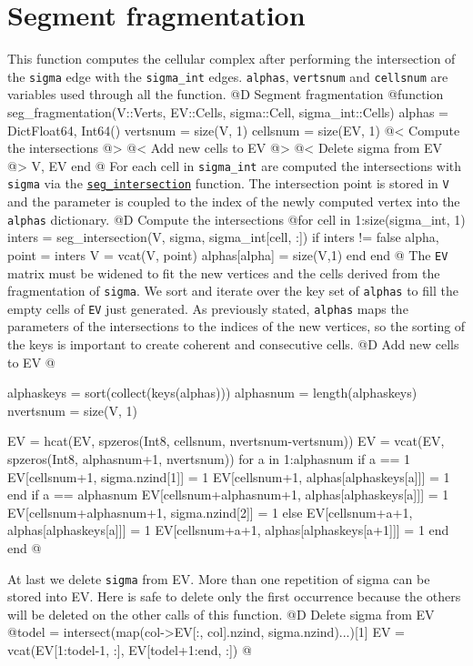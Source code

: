\documentclass[10pt,oneside]{article}
\begin{document}
\section{Segment fragmentation}
This function computes the cellular complex after performing the intersection of the \texttt{sigma} edge 
with the \texttt{sigma\_int} edges.
\texttt{alphas}, \texttt{vertsnum} and \texttt{cellsnum} are variables used through all the function.
@D Segment fragmentation
@{function seg_fragmentation(V::Verts, EV::Cells, sigma::Cell, sigma_int::Cells)
    alphas = Dict{Float64, Int64}()
    vertsnum = size(V, 1)
    cellsnum = size(EV, 1)
    @< Compute the intersections @>
    @< Add new cells to EV @>
    @< Delete sigma from EV @>
    V, EV
end
@}
For each cell in \texttt{sigma\_int} are computed the intersections with \texttt{sigma} via 
the \hyperref[seg_intersection]{\texttt{seg\_intersection}} function. The intersection point is
stored in \texttt{V} and the parameter is coupled to the index of the newly computed vertex into 
the \texttt{alphas} dictionary.
@D Compute the intersections
@{for cell in 1:size(sigma_int, 1)
    inters = seg_intersection(V, sigma, sigma_int[cell, :])
    if inters != false
        alpha, point = inters
        V = vcat(V, point)
        alphas[alpha] = size(V,1)
    end
end
@}
The \texttt{EV} matrix must be widened to fit the new vertices and the cells derived from 
the fragmentation of \texttt{sigma}. We sort and iterate over the key set of \texttt{alphas}
to fill the empty cells of \texttt{EV} just generated. As previously stated, \texttt{alphas} maps 
the parameters of the intersections to the indices of the new vertices, so the sorting of the keys 
is important to create coherent and consecutive cells.
@D Add new cells to EV
@{alphaskeys = sort(collect(keys(alphas)))
alphasnum = length(alphaskeys)
nvertsnum = size(V, 1)

EV = hcat(EV, spzeros(Int8, cellsnum, nvertsnum-vertsnum))
EV = vcat(EV, spzeros(Int8, alphasnum+1, nvertsnum))
for a in 1:alphasnum
    if a == 1
        EV[cellsnum+1, sigma.nzind[1]] = 1
        EV[cellsnum+1, alphas[alphaskeys[a]]] = 1
    end
    if a == alphasnum
        EV[cellsnum+alphasnum+1, alphas[alphaskeys[a]]] = 1
        EV[cellsnum+alphasnum+1, sigma.nzind[2]] = 1
    else
        EV[cellsnum+a+1, alphas[alphaskeys[a]]] = 1
        EV[cellsnum+a+1, alphas[alphaskeys[a+1]]] = 1
    end
end
@}
At last we delete \texttt{sigma} from EV. More than one repetition of sigma can 
be stored into EV. Here is safe to delete only the first occurrence because the 
others will be deleted on the other calls of this function.
@D Delete sigma from EV
@{todel = intersect(map(col->EV[:, col].nzind, sigma.nzind)...)[1]
EV = vcat(EV[1:todel-1, :], EV[todel+1:end, :])
@}
\end{document}
